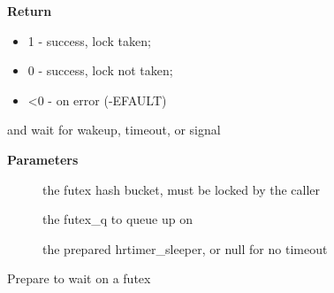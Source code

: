 \documentclass[a4paper,8pt,english]{sphinxmanual}
\begin{document}
\textbf{Return}
\begin{itemize}
\item {} 
1 - success, lock taken;

\item {} 
0 - success, lock not taken;

\item {} 
\textless{}0 - on error (-EFAULT)

\end{itemize}

\begin{fulllineitems}
\label{kernel-hacking/locking:c.futex_wait_queue_me}
{\hyperref[kernel\string-hacking/locking:c.queue_me]{\emph{}}} and wait for wakeup, timeout, or signal

\end{fulllineitems}


\textbf{Parameters}
\begin{description}
\item[{}] \leavevmode
the futex hash bucket, must be locked by the caller

\item[{}] \leavevmode
the futex\_q to queue up on

\item[{}] \leavevmode
the prepared hrtimer\_sleeper, or null for no timeout

\end{description}

\begin{fulllineitems}
\label{kernel-hacking/locking:c.futex_wait_setup}
Prepare to wait on a futex

\end{fulllineitems}
\end{document}
